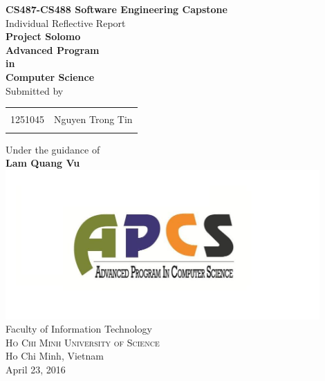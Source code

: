\begin{titlepage}

\begin{center}

\textup{\small {\bf CS487-CS488 Software Engineering Capstone} \\ Individual Reflective Report}\\[0.2in]

\Large \textbf {Project Solomo}\\[0.5in]

       {\bf Advanced Program \\in\\ Computer Science}\\[0.5in]

\normalsize Submitted by \\
\begin{table}[h]
\centering
\begin{tabular}{lr}\hline \\
1251045 & Nguyen Trong Tin \\
\\ \hline 
\end{tabular}
\end{table}

\vspace{.1in}
Under the guidance of\\
{\textbf{Lam Quang Vu}}\\[0.2in]
\vfill
\includegraphics[width=0.9\textwidth]{./apcs}\\[0.1in]
\Large{Faculty of Information Technology}\\
\normalsize
\textsc{Ho Chi Minh University of Science}\\
Ho Chi Minh, Vietnam \\
\vspace{0.2cm}
April 23, 2016

\end{center}

\end{titlepage}
